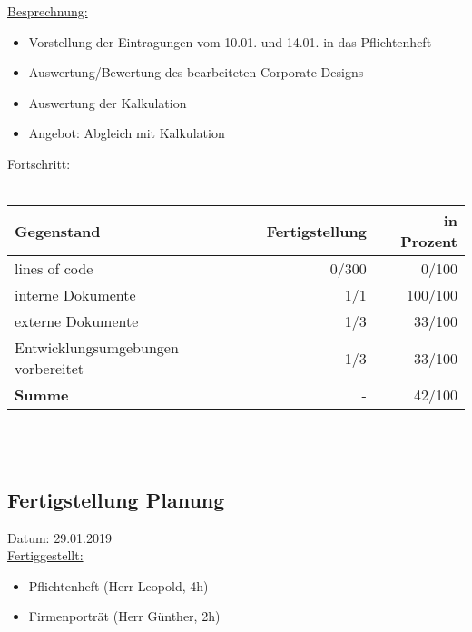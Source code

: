 \documentclass[12pt]{article}
\begin{document}
\uline{Besprechnung:}
\begin{itemize}\itemsep0em
\item Vorstellung der Eintragungen vom 10.01. und 14.01. in das Pflichtenheft
\item Auswertung/Bewertung des bearbeiteten Corporate Designs
\item Auswertung der Kalkulation
\item Angebot: Abgleich mit Kalkulation \\
\end{itemize}



Fortschritt:\\\\
\begin{tabularx}{\textwidth}{|X|r|r|} \hline
\textbf{Gegenstand}&\textbf{Fertigstellung} & \textbf{in Prozent}\\ \hline
lines of code & 0/300  & 0/100\\ \hline
interne Dokumente & 1/1 & 100/100  \\ \hline
externe Dokumente & 1/3 & 33/100 \\ \hline
Entwicklungsumgebungen vorbereitet & 1/3 & 33/100 \\ \hline
\textbf{Summe} & - & 42/100  \\ \hline
\end{tabularx}\\\\
\newpage

\subsection{Fertigstellung Planung}
Datum: 29.01.2019 \\

\uline{Fertiggestellt:}
\begin{itemize}\itemsep0em
\item Pflichtenheft (Herr Leopold, 4h)
\item Firmenporträt (Herr Günther, 2h)
\end{itemize}
\end{document}
